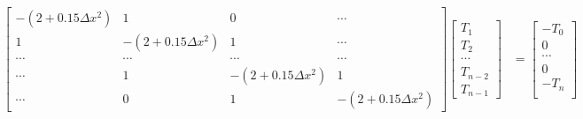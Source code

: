 \documentclass{article}
\begin{document}
\begin{solution}
\begin{align*}
\\
\begin{bmatrix}
-(2+0.15\Delta x^{2})	&	1	&	0	&\cdots	\\
1	&	-(2+0.15\Delta x^{2})	&	1	&\cdots	\\
\cdots	&	\cdots	&	\cdots	&	\cdots	\\
\cdots	&	1	&	-(2+0.15\Delta x^{2})	&	1\\
\cdots	&	0	&	1	&	-(2+0.15\Delta x^{2})
\end{bmatrix}
\begin{bmatrix}
T_{1}\\
T_{2}\\
\cdots\\
T_{n-2}\\
T_{n-1}
\end{bmatrix}
&=
\begin{bmatrix}
-T_{0}\\
0\\
\cdots\\
0\\
-T_{n}\\
\end{bmatrix}
\end{align*}


\end{solution}
\end{document}
